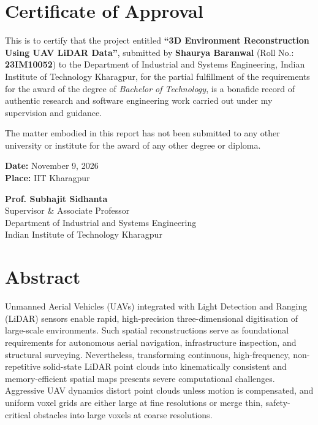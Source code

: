 \documentclass[11pt,a4paper]{report}
\begin{document}
\chapter*{Certificate of Approval}
This is to certify that the project entitled \textbf{``3D Environment Reconstruction Using UAV LiDAR Data''}, submitted by \textbf{Shaurya Baranwal} (Roll No.: \textbf{23IM10052}) to the Department of Industrial and Systems Engineering, Indian Institute of Technology Kharagpur, for the partial fulfillment of the requirements for the award of the degree of \textit{Bachelor of Technology}, is a bonafide record of authentic research and software engineering work carried out under my supervision and guidance.

The matter embodied in this report has not been submitted to any other university or institute for the award of any other degree or diploma.

\vspace{35mm}
\noindent
\begin{minipage}[t]{0.45\textwidth}
    \textbf{Date:} November 9, 2026\\
    \textbf{Place:} IIT Kharagpur
\end{minipage}
\hfill
\begin{minipage}[t]{0.5\textwidth}
    \begin{flushright}
        \textbf{Prof. Subhajit Sidhanta}\\
        Supervisor \& Associate Professor\\
        Department of Industrial and Systems Engineering\\
        Indian Institute of Technology Kharagpur
    \end{flushright}
\end{minipage}

\newpage

\chapter*{Abstract}
Unmanned Aerial Vehicles (UAVs) integrated with Light Detection and Ranging (LiDAR) sensors enable rapid, high-precision three-dimensional digitisation of large-scale environments. Such spatial reconstructions serve as foundational requirements for autonomous aerial navigation, infrastructure inspection, and structural surveying. Nevertheless, transforming continuous, high-frequency, non-repetitive solid-state LiDAR point clouds into kinematically consistent and memory-efficient spatial maps presents severe computational challenges. Aggressive UAV dynamics distort point clouds unless motion is compensated, and uniform voxel grids are either large at fine resolutions or merge thin, safety-critical obstacles into large voxels at coarse resolutions.
\end{document}
